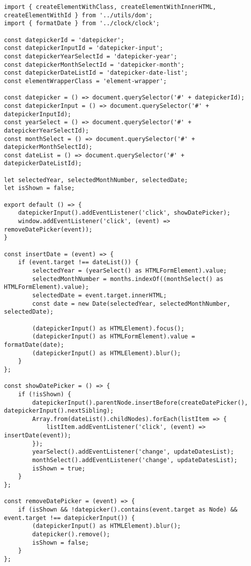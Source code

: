 \documentclass[a4paper,14pt]{extarticle}
\begin{document}
\begin{lstlisting}
import { createElementWithClass, createElementWithInnerHTML, createElementWithId } from '../utils/dom';
import { formatDate } from '../clock/clock';

const datepickerId = 'datepicker';
const datepickerInputId = 'datepicker-input';
const datepickerYearSelectId = 'datepicker-year';
const datepickerMonthSelectId = 'datepicker-month';
const datepickerDateListId = 'datepicker-date-list';
const elementWrapperClass = 'element-wrapper';

const datepicker = () => document.querySelector('#' + datepickerId);
const datepickerInput = () => document.querySelector('#' + datepickerInputId);
const yearSelect = () => document.querySelector('#' + datepickerYearSelectId);
const monthSelect = () => document.querySelector('#' + datepickerMonthSelectId);
const dateList = () => document.querySelector('#' + datepickerDateListId);

let selectedYear, selectedMonthNumber, selectedDate;
let isShown = false;

export default () => {
    datepickerInput().addEventListener('click', showDatePicker);
    window.addEventListener('click', (event) => removeDatePicker(event));
}

const insertDate = (event) => {
    if (event.target !== dateList()) {
        selectedYear = (yearSelect() as HTMLFormElement).value;
        selectedMonthNumber = months.indexOf((monthSelect() as HTMLFormElement).value);
        selectedDate = event.target.innerHTML;
        const date = new Date(selectedYear, selectedMonthNumber, selectedDate);

        (datepickerInput() as HTMLElement).focus();
        (datepickerInput() as HTMLFormElement).value = formatDate(date);
        (datepickerInput() as HTMLElement).blur();
    }
};

const showDatePicker = () => {
    if (!isShown) {
        datepickerInput().parentNode.insertBefore(createDatePicker(), datepickerInput().nextSibling);
        Array.from(dateList().childNodes).forEach(listItem => {
            listItem.addEventListener('click', (event) => insertDate(event));
        });
        yearSelect().addEventListener('change', updateDatesList);
        monthSelect().addEventListener('change', updateDatesList);
        isShown = true;
    }
};

const removeDatePicker = (event) => {
    if (isShown && !datepicker().contains(event.target as Node) && event.target !== datepickerInput()) {
        (datepickerInput() as HTMLElement).blur();
        datepicker().remove();
        isShown = false;
    }
};


\end{lstlisting}
\end{document}
